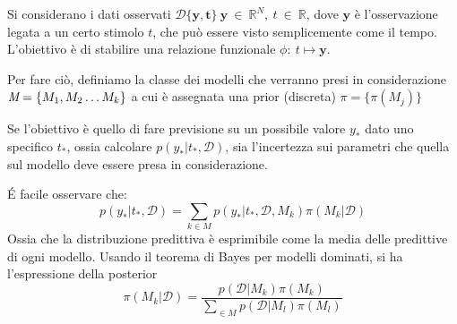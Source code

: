 \documentclass[12pt,a4paper]{article}
\begin{document}
Si considerano i dati osservati $ \mathcal{D} \{\bm{y}, \bm t \} \ \bm y \ \in \ \mathbb{R}^N, \ t \ \in \ \mathbb{R}$, dove $\bm y$ è l'osservazione legata a un certo stimolo $t$, che può essere visto semplicemente come il tempo. L'obiettivo è di stabilire una relazione funzionale $\phi: \ t \mapsto \bm y$.

Per fare ciò, definiamo la classe dei modelli che verranno presi in considerazione $\textit M = \{M_1,M_2 \dots M_k \}$ a cui è assegnata una prior (discreta) $\pi = \{\pi (M_j) \}$

Se l'obiettivo è quello di fare previsione su un possibile valore $y_*$ dato uno specifico $t_*$, ossia calcolare $p(y_* | t_*, \mathcal{D})$, sia l'incertezza sui parametri che quella sul modello deve essere presa in considerazione.

\'E facile osservare che:
\begin{equation}
	p(y_* | t_*, \mathcal{D}) = \sum_{k \in M} p(y_* | t_*, \mathcal{D}, M_k) \pi(M_k|\mathcal{D})	
\end{equation}
Ossia che la distribuzione predittiva è esprimibile come la media delle predittive di ogni modello. 
Usando il teorema di Bayes per modelli dominati, si ha l'espressione della posterior
\begin{equation}
	\pi(M_k|\mathcal{D}) = \frac{p(\mathcal{D}|M_k) \pi(M_k)}{\sum_{ \in {M}} p(\mathcal{D}|M_l) \pi(M_l)}	
\end{equation}
\end{document}
